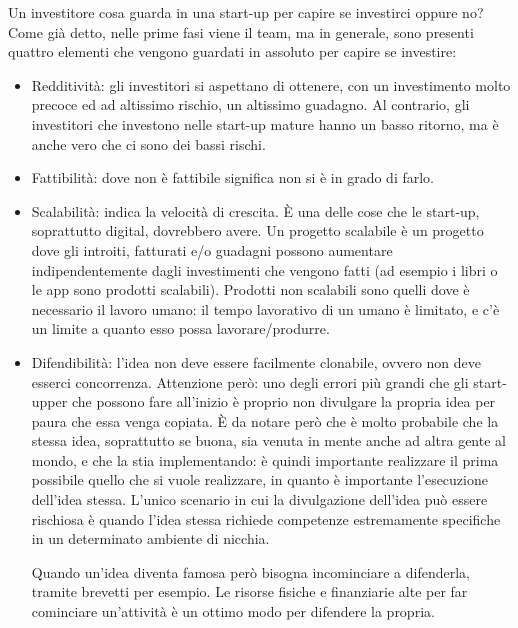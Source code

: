 Un investitore cosa guarda in una start-up per capire se investirci oppure no?
Come già detto, nelle prime fasi viene il team, ma in generale, sono presenti
quattro elementi che vengono guardati in assoluto per capire se investire:
\begin{itemize}
 \item Redditività: gli investitori si aspettano di ottenere, con un
investimento molto precoce ed ad altissimo rischio, un altissimo guadagno. Al
contrario, gli investitori che investono nelle start-up mature hanno un basso
ritorno, ma è anche vero che ci sono dei bassi rischi.
 \item Fattibilità: dove non è fattibile significa non si è in grado di farlo.
 \item Scalabilità: indica la velocità di crescita. È una delle cose che le
start-up, soprattutto digital, dovrebbero avere. Un progetto scalabile è un
progetto dove gli introiti, fatturati e/o guadagni possono aumentare
indipendentemente dagli investimenti che vengono fatti (ad esempio i libri o le
app sono prodotti scalabili). Prodotti non scalabili sono quelli dove è
necessario il lavoro umano: il tempo lavorativo di un umano è limitato, e c'è
un limite a quanto esso possa lavorare/produrre.
 \item Difendibilità: l'idea non deve essere facilmente clonabile, ovvero non
deve esserci concorrenza. Attenzione però: uno degli errori più grandi che gli
start-upper che possono fare all'inizio è proprio non divulgare la propria idea
per paura che essa venga copiata. È da notare però che è molto probabile che
la stessa idea, soprattutto se buona, sia venuta in mente anche ad altra gente
al mondo, e che la stia implementando: è quindi importante realizzare il prima
possibile quello che si vuole realizzare, in quanto è importante l'esecuzione
dell'idea stessa. L'unico scenario in cui la divulgazione dell'idea può essere
rischiosa è quando l'idea stessa richiede competenze estremamente specifiche in
un determinato ambiente di nicchia.

Quando un'idea diventa famosa però bisogna incominciare a
difenderla, tramite brevetti per esempio. Le risorse fisiche e finanziarie alte
per far cominciare un'attività è un ottimo modo per difendere la propria.
\end{itemize}
